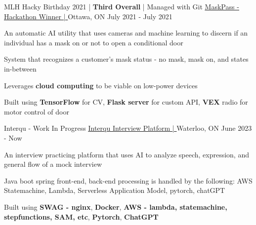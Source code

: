 \begin{cventries}
	\cventry
	{MLH Hacky Birthday 2021 | \textbf{Third Overall} | Managed with Git} %
	{\underline{\href{https://devpost.com/software/mlh-birthday-ads}{MaskPass - Hackathon Winner | \ExternalLink}}} %
	{Ottawa, ON} %
	{July 2021 - July 2021} %
	{
		\begin{cvitems} %
			\item {An automatic AI utility that uses cameras and machine learning to discern if an individual has a mask on or not to open a conditional door}
			\item {System that recognizes a customer’s mask status - no mask, mask on, and states in-between}
			\item {Leverages \textbf{cloud computing} to be viable on low-power devices}
			\item {Built using \textbf{TensorFlow} for CV, \textbf{Flask server} for custom API, \textbf{VEX} radio for motor control of door}
		\end{cvitems}
	}

	\cventry
	{Interqu - Work In Progress} %
	{\underline{\href{https://interqu.lefan.ca}{Interqu Interview Platform | \ExternalLink}}} %
	{Waterloo, ON} %
	{June 2023 - Now} %
	{
		\begin{cvitems} %
			\item {An interview practicing platform that uses AI to analyze speech, expression, and general flow of a mock interview}
			\item {Java boot spring front-end, back-end processing is handled by the following: AWS Statemachine, Lambda, Serverless Application Model, pytorch, chatGPT}
			\item {Built using \textbf{SWAG - nginx}, \textbf{Docker}, \textbf{AWS - lambda, statemachine, stepfunctions, SAM, etc}, \textbf{Pytorch}, \textbf{ChatGPT}}
		\end{cvitems}
	}




\end{cventries}
